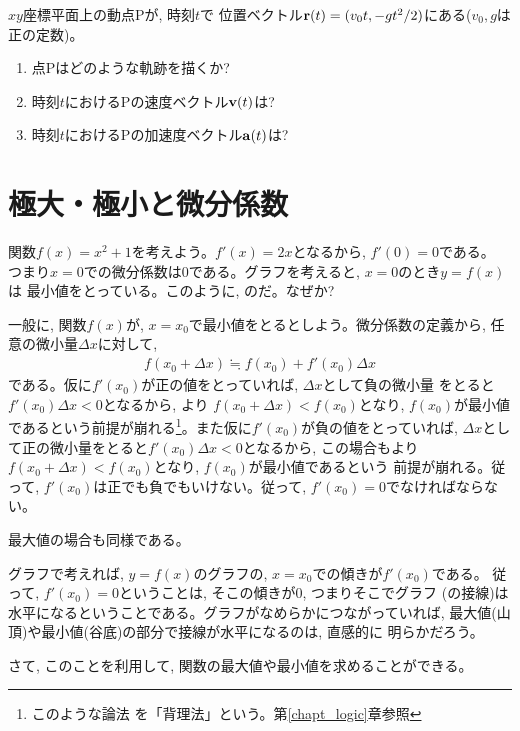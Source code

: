 \begin{q}\label{q:vect_throw} $xy$座標平面上の動点Pが, 時刻$t$で
位置ベクトル${\bf r}(t)=(v_0t, -gt^2/2)$にある($v_0, g$は正の定数)。
\begin{enumerate}
\item 点Pはどのような軌跡を描くか? 
\item 時刻$t$におけるPの速度ベクトル${\bf v}(t)$は? 
\item 時刻$t$におけるPの加速度ベクトル${\bf a}(t)$は? 
\end{enumerate}\end{q}

\section{極大・極小と微分係数}

関数$f(x)=x^2+1$を考えよう。$f'(x)=2x$となるから, $f'(0)=0$である。
つまり$x=0$での微分係数は0である。グラフを考えると, $x=0$のとき$y=f(x)$は
最小値をとっている。このように, のだ。なぜか? 

一般に, 関数$f(x)$が, $x=x_0$で最小値をとるとしよう。微分係数の定義から, 
任意の微小量$\Delta x$に対して, 
\begin{eqnarray}f(x_0+\Delta x)\fallingdotseq f(x_0)+f'(x_0)\Delta x
\label{eq:diff_def_again0}\end{eqnarray}
である。仮に$f'(x_0)$が正の値をとっていれば, $\Delta x$として負の微小量
をとると$f'(x_0)\Delta x<0$となるから, より
$f(x_0+\Delta x)<f(x_0)$となり, $f(x_0)$が最小値であるという前提が崩れる\footnote{このような論法
を「背理法」という。第\ref{chapt_logic}章参照}。また仮に$f'(x_0)$が負の値をとっていれば, 
$\Delta x$として正の微小量をとると$f'(x_0)\Delta x<0$となるから, 
この場合もより$f(x_0+\Delta x)<f(x_0)$となり, $f(x_0)$が最小値であるという
前提が崩れる。従って, $f'(x_0)$は正でも負でもいけない。従って, $f'(x_0)=0$でなければならない。

最大値の場合も同様である。

グラフで考えれば, $y=f(x)$のグラフの, $x=x_0$での傾きが$f'(x_0)$である。
従って, $f'(x_0)=0$ということは, そこの傾きが0, つまりそこでグラフ
(の接線)は水平になるということである。グラフがなめらかにつながっていれば, 
最大値(山頂)や最小値(谷底)の部分で接線が水平になるのは, 直感的に
明らかだろう。

さて, このことを利用して, 関数の最大値や最小値を求めることができる。\hv

